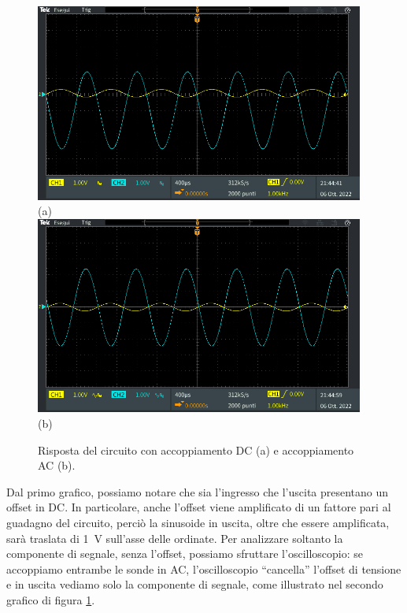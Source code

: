 \documentclass{report}
\begin{document}
\begin{figure}
\centering
\includegraphics[height=6.5cm]{immagini/TEK00018}\\(a)\\[1ex]
\includegraphics[height=6.5cm]{immagini/TEK00019}\\(b)
\caption{Risposta del circuito con accoppiamento DC (a) e accoppiamento AC (b).}
	\label{figura:accopp}
\end{figure}
Dal primo grafico, possiamo notare che sia l'ingresso che l'uscita presentano un offset in DC. In particolare, anche l'offset viene amplificato di un fattore pari al guadagno del circuito, perciò la sinusoide in uscita, oltre che essere amplificata, sarà traslata di \SI{1}{\volt} sull'asse delle ordinate. Per analizzare soltanto la componente di segnale, senza l'offset, possiamo sfruttare l'oscilloscopio: se accoppiamo entrambe le sonde in AC, l'oscilloscopio ``cancella'' l'offset di tensione e in uscita vediamo solo la componente di segnale, come illustrato nel secondo grafico di figura \ref{figura:accopp}.

\end{document}
